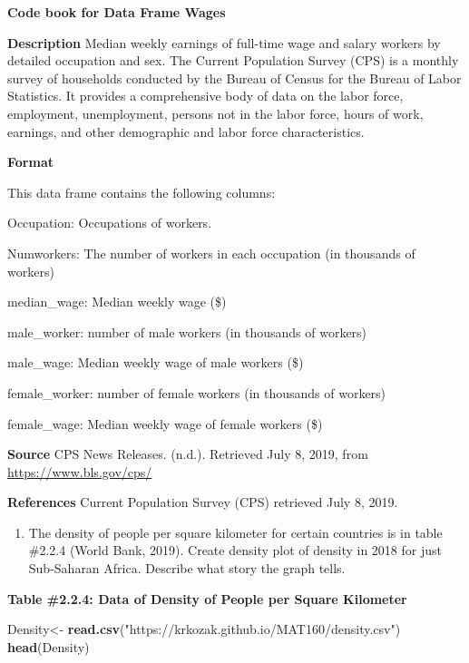 \documentclass[
]{book}
\newenvironment{Shaded}{\begin{snugshade}}{\end{snugshade}}
\newcommand{\KeywordTok}[1]{\textcolor[rgb]{0.13,0.29,0.53}{\textbf{#1}}}
\newcommand{\NormalTok}[1]{#1}
\newcommand{\StringTok}[1]{\textcolor[rgb]{0.31,0.60,0.02}{#1}}
\providecommand{\tightlist}{%
  \setlength{\itemsep}{0pt}\setlength{\parskip}{0pt}}
\begin{document}
\textbf{Code book for Data Frame Wages}

\textbf{Description}
Median weekly earnings of full-time wage and salary workers by detailed occupation and sex. The Current Population Survey (CPS) is a monthly survey of households conducted by the Bureau of Census for the Bureau of Labor Statistics. It provides a comprehensive body of data on the labor force, employment, unemployment, persons not in the labor force, hours of work, earnings, and other demographic and labor force characteristics.

\textbf{Format}

This data frame contains the following columns:

Occupation: Occupations of workers.

Numworkers: The number of workers in each occupation (in thousands of workers)

median\_wage: Median weekly wage (\$)

male\_worker: number of male workers (in thousands of workers)

male\_wage: Median weekly wage of male workers (\$)

female\_worker: number of female workers (in thousands of workers)

female\_wage: Median weekly wage of female workers (\$)

\textbf{Source}
CPS News Releases. (n.d.). Retrieved July 8, 2019, from \url{https://www.bls.gov/cps/}

\textbf{References}
Current Population Survey (CPS) retrieved July 8, 2019.

\begin{enumerate}
\def\labelenumi{\arabic{enumi}.}
\setcounter{enumi}{1}
\tightlist
\item
  The density of people per square kilometer for certain countries is in table \#2.2.4 (World Bank, 2019). Create density plot of density in 2018 for just Sub-Saharan Africa. Describe what story the graph tells.
\end{enumerate}

\textbf{Table \#2.2.4: Data of Density of People per Square Kilometer}

\begin{Shaded}
\begin{Highlighting}[]
\NormalTok{Density<-}\StringTok{ }\KeywordTok{read.csv}\NormalTok{(}\StringTok{"https://krkozak.github.io/MAT160/density.csv"}\NormalTok{) }
\KeywordTok{head}\NormalTok{(Density)}
\end{Highlighting}
\end{Shaded}
\end{document}
